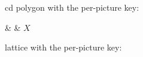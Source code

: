 \documentclass[varwidth=10cm, border=3pt]{standalone}
\begin{document}
cd polygon with the per-picture key:
\begin{tenkzcd}[polygon=3, tensor style=box]
   &  & $X$
\end{tenkzcd}

lattice with the per-picture key:
\begin{tenkzlattice}[rows=2, cols=2, tensor style=box]
\end{tenkzlattice}
\end{document}
